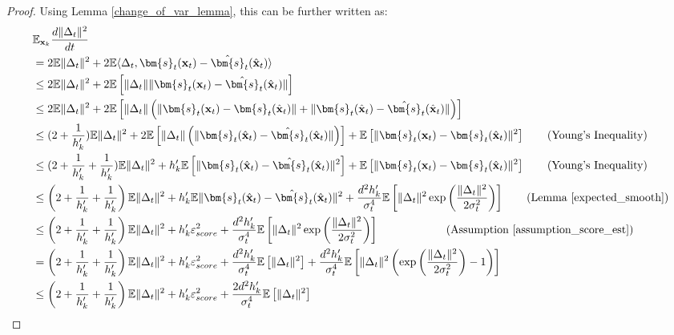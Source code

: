 \documentclass[11pt]{article}
\def\rvx{{\mathbf{x}}}
\def\vs{{\bm{s}}}
\begin{document}
\begin{proof}
\noindent
Using Lemma \ref{change_of_var_lemma}, this can be further written as:
\begin{equation*}
\begin{aligned}
&\mathbb{E}_{\rvx_k}\frac{d \|\Delta_t\|^2}{dt} \\
&= 2\mathbb{E}\|\Delta_t\|^2 + 2\mathbb{E}\langle\Delta_t,\vs_t(\rvx_t)-\hat{\vs}_t(\hat{\rvx}_t)\rangle \\
    &\leq 2\mathbb{E}\|\Delta_t\|^2 + 2\mathbb{E}\left[\|\Delta_t\|\|\vs_t(\rvx_t)-\hat{\vs}_t(\hat{\rvx}_t)\| \right] \\
    &\leq 2\mathbb{E}\|\Delta_t\|^2 + 2\mathbb{E}\left[\|\Delta_t\|\left(\|\vs_t(\rvx_t)-{\vs}_t(\hat{\rvx}_t)\| +\|\vs_t(\hat{\rvx}_t)-\hat{\vs}_t(\hat{\rvx}_t)\|\right) \right]\\
    &\leq (2+\frac{1}{h'_k})\mathbb{E}\|\Delta_t\|^2 + 2\mathbb{E}\left[\|\Delta_t\|\left(\|\vs_t(\hat{\rvx}_t)-\hat{\vs}_t(\hat{\rvx}_t)\|\right)\right] + \mathbb{E}\left[\|\vs_t(\rvx_t)-{\vs}_t(\hat{\rvx}_t)\|^2\right] \qquad \text{(Young's Inequality)} \\
    &\leq (2+\frac{1}{h'_k} + \frac{1}{h'_k})\mathbb{E}\|\Delta_t\|^2 + h'_k\mathbb{E}\left[\|\vs_t(\hat{\rvx}_t)-\hat{\vs}_t(\hat{\rvx}_t)\|^2\right] + \mathbb{E}\left[\|\vs_t(\rvx_t)-{\vs}_t(\hat{\rvx}_t)\|^2\right] \qquad \text{(Young's Inequality)} \\
    &\leq \left(2+\frac{1}{h'_k}+\frac{1}{h'_k}\right)\mathbb{E} \|\Delta_t\|^2 + h'_k\mathbb{E}\|\vs_t(\hat{\rvx}_t)-\hat{\vs}_t(\hat{\rvx}_t)\|^2 + \frac{d^2h'_k}{\sigma_t^4}\mathbb{E}\left[\|\Delta_t\|^2\exp\left(\frac{\|\Delta_t\|^2}{2\sigma_t^2}\right) \right] \qquad \text{(Lemma \ref{expected_smooth})}\\
    &\leq \left(2+\frac{1}{h'_k}+\frac{1}{h'_k}\right)\mathbb{E} \|\Delta_t\|^2 + h'_k\varepsilon^2_{score} + \frac{d^2h'_k}{\sigma_t^4}\mathbb{E}\left[\|\Delta_t\|^2\exp\left(\frac{\|\Delta_t\|^2}{2\sigma_t^2}\right) \right] \qquad \qquad  \qquad\text{(Assumption \ref{assumption_score_est})}\\
    &=  \left(2+\frac{1}{h'_k}+\frac{1}{h'_k}\right)\mathbb{E} \|\Delta_t\|^2 + h'_k\varepsilon^2_{score} + \frac{d^2h'_k}{\sigma_t^4}\mathbb{E}\left[\|\Delta_t\|^2 \right]+ \frac{d^2h'_k}{\sigma_t^4}\mathbb{E}\left[\|\Delta_t\|^2\left(\exp\left(\frac{\|\Delta_t\|^2}{2\sigma_t^2}\right) -1 \right)\right]\\
    &\leq \left(2+\frac{1}{h'_k}+\frac{1}{h'_k}\right)\mathbb{E} \|\Delta_t\|^2 + h'_k\varepsilon^2_{score} + \frac{2d^2h'_k}{\sigma_t^4}\mathbb{E}\left[\|\Delta_t\|^2 \right]\\
    \end{aligned}
\end{equation*}


\end{proof}
\end{document}
